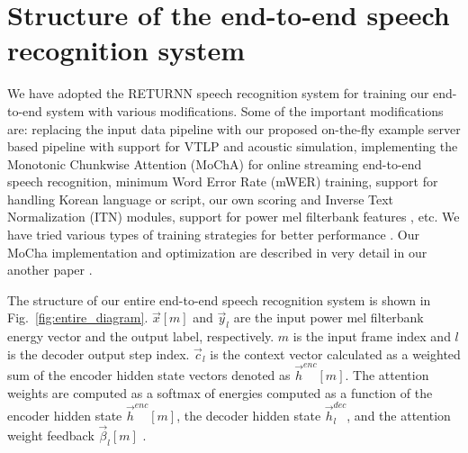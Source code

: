 \documentclass{article}
\begin{document}
\section{Structure of the end-to-end speech recognition system}
\label{sec:end_to_end_speech_recognition}




We have adopted the RETURNN speech recognition system \cite{p_doetsch_icassp_2017_00,
a_zeyer_interspeech_2018_00} for training our end-to-end system with various modifications.
Some of the important modifications are: replacing the input data pipeline with our 
proposed on-the-fly example server based pipeline with support for VTLP
and acoustic simulation,
implementing the Monotonic Chunkwise Attention (MoChA) \cite{c_chiu_iclr_2018_00}
for online streaming end-to-end speech recognition, minimum Word Error Rate (mWER) 
training, support for handling Korean language or script, our own scoring and Inverse Text 
Normalization (ITN) modules, support for power mel filterbank features
\cite{c_kim_interspeech_2019_00, c_kim_asru_2019_00}, etc. We have tried
various types of training strategies for better performance
\cite{d_gowda_interspeech_2019_00, a_garg_asru_2019_00}.
Our MoCha implementation and optimization are described in very detail in our
another paper \cite{k_kim_asru_2019_00}.

The structure of our entire end-to-end speech recognition system
 is shown in Fig.~\ref{fig:entire_diagram}.
 $\vec{x}[m]$ and $\vec{y}_l$ are the input power mel 
filterbank energy vector and the output label,
respectively. $m$ is the input frame index and $l$ is the decoder output
step index. $\vec{c}_l$ is the context vector calculated 
as a weighted sum of the encoder hidden state vectors denoted as $\vec{h}^{enc}[m]$.
The attention weights are computed as a softmax of energies computed as 
a function of the encoder hidden state $\vec{h}^{enc}[m]$, the decoder hidden state
$\vec{h}^{dec}_l$, and the attention weight
feedback $\vec{\beta}_l[m]$  \cite{a_zeyer_interspeech_2018_00}.
\end{document}

